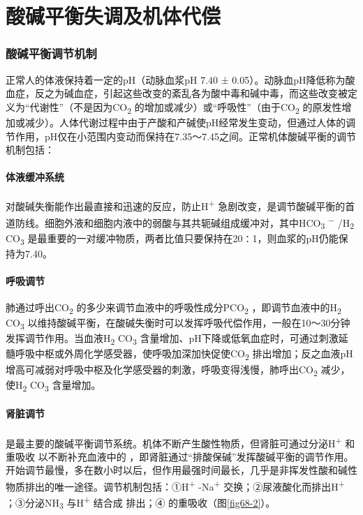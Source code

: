 \section{酸碱平衡失调及机体代偿}

\subsubsection{酸碱平衡调节机制}

正常人的体液保持着一定的pH（动脉血浆pH 7.40 ±
0.05）。动脉血pH降低称为酸血症，反之为碱血症，引起这些改变的紊乱各为酸中毒和碱中毒，而这些改变被定义为“代谢性”（不是因为CO\textsubscript{2}
的增加或减少）或“呼吸性”（由于CO\textsubscript{2}
的原发性增加或减少）。人体代谢过程中由于产酸和产碱使pH经常发生变动，但通过人体的调节作用，pH仅在小范围内变动而保持在7.35～7.45之间。正常机体酸碱平衡的调节机制包括：

\paragraph{体液缓冲系统}

对酸碱失衡能作出最直接和迅速的反应，防止H\textsuperscript{+}
急剧改变，是调节酸碱平衡的首道防线。细胞外液和细胞内液中的弱酸与其共轭碱组成缓冲对，其中HCO\textsubscript{3}
\textsuperscript{−} /H\textsubscript{2} CO\textsubscript{3}
是最重要的一对缓冲物质，两者比值只要保持在20∶1，则血浆的pH仍能保持为7.40。

\paragraph{呼吸调节}

肺通过呼出CO\textsubscript{2}
的多少来调节血液中的呼吸性成分PCO\textsubscript{2}
，即调节血液中的H\textsubscript{2} CO\textsubscript{3}
以维持酸碱平衡，在酸碱失衡时可以发挥呼吸代偿作用，一般在10～30分钟发挥调节作用。当血液H\textsubscript{2}
CO\textsubscript{3}
含量增加、pH下降或低氧血症时，可通过刺激延髓呼吸中枢或外周化学感受器，使呼吸加深加快促使CO\textsubscript{2}
排出增加；反之血液pH增高可减弱对呼吸中枢及化学感受器的刺激，呼吸变得浅慢，肺呼出CO\textsubscript{2}
减少，使H\textsubscript{2} CO\textsubscript{3} 含量增加。

\paragraph{肾脏调节}

是最主要的酸碱平衡调节系统。机体不断产生酸性物质，但肾脏可通过分泌H\textsuperscript{+}
和重吸收{} 以不断补充血液中的{}
，即肾脏通过“排酸保碱”发挥酸碱平衡的调节作用。开始调节最慢，多在数小时以后，但作用最强时间最长，几乎是非挥发性酸和碱性物质排出的唯一途径。调节机制包括：①H\textsuperscript{+}
-Na\textsuperscript{+} 交换；②尿液酸化而排出H\textsuperscript{+}
；③分泌NH\textsubscript{3} 与H\textsuperscript{+} 结合成{} 排出；④{}
的重吸收（图\ref{fig68-2}）。

